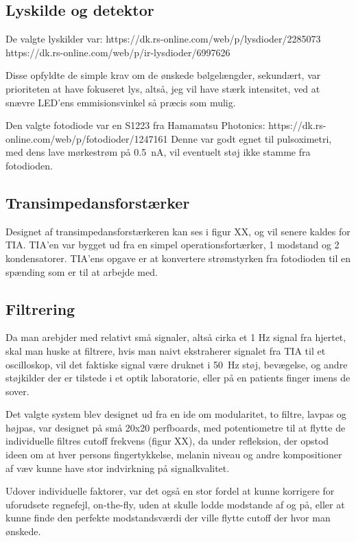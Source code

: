   \subsection{Lyskilde og detektor} %
De valgte lyskilder var:
https://dk.rs-online.com/web/p/lysdioder/2285073
https://dk.rs-online.com/web/p/ir-lysdioder/6997626

Disse opfyldte de simple krav om de ønskede bølgelængder, sekundært, var prioriteten at have fokuseret lys, altså, jeg vil have stærk intensitet, ved at snævre LED'ens emmisionsvinkel så præcis som mulig.

Den valgte fotodiode var en S1223 fra Hamamatsu Photonics:
https://dk.rs-online.com/web/p/fotodioder/1247161
Denne var godt egnet til pulsoximetri, med dens lave mørkestrøm på \SI{0.5}{nA}, vil eventuelt støj ikke stamme fra fotodioden.


  \subsection{Transimpedansforstærker} %
Designet af transimpedansforstærkeren kan ses i figur XX, og vil senere kaldes for TIA. TIA'en var bygget ud fra en simpel operationsfortærker, 1 modstand og 2 kondensatorer. TIA'ens opgave er at konvertere strømstyrken fra fotodioden til en spænding som er til at arbejde med. 
  
  \subsection{Filtrering} %
Da man arebjder med relativt små signaler, altså cirka et 1 Hz signal fra hjertet, skal man huske at filtrere, hvis man naivt ekstraherer signalet fra TIA til et oscilloskop, vil det faktiske signal være druknet i \SI{50}{Hz} støj, bevægelse, og andre støjkilder der er tilstede i et optik laboratorie, eller på en patients finger imens de sover.

Det valgte system blev designet ud fra en ide om modularitet, to filtre, lavpas og højpas, var designet på små 20x20 perfboards, med potentiometre til at flytte de individuelle filtres cutoff frekvens (figur XX), da under refleksion, der opstod ideen om at hver persons fingertykkelse, melanin niveau og andre kompositioner af væv kunne have stor indvirkning på signalkvalitet.

Udover individuelle faktorer, var det også en stor fordel at kunne korrigere for uforudsete regnefejl, on-the-fly, uden at skulle lodde modstande af og på, eller at kunne finde den perfekte modstandsværdi der ville flytte cutoff der hvor man ønskede.
  
